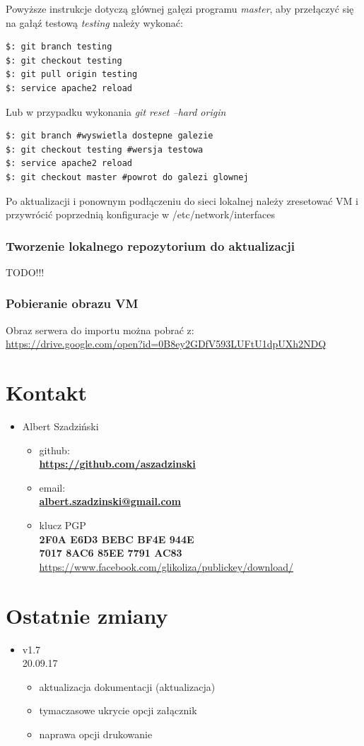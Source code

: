 \documentclass[12pt,a4paper]{article}
\begin{document}
Powyższe instrukcje dotyczą głównej gałęzi programu \textit{master}, aby przełączyć się na gałąź testową \textit{testing} należy wykonać:
\begin{lstlisting}
$: git branch testing
$: git checkout testing
$: git pull origin testing
$: service apache2 reload
\end{lstlisting}
Lub w przypadku wykonania \textit{git reset --hard origin}
\begin{lstlisting}
$: git branch #wyswietla dostepne galezie
$: git checkout testing #wersja testowa
$: service apache2 reload
$: git checkout master #powrot do galezi glownej
\end{lstlisting}
Po aktualizacji i ponownym podłączeniu do sieci lokalnej należy zresetować VM i przywrócić poprzednią konfiguracje w /etc/network/interfaces
\subsubsection{Tworzenie lokalnego repozytorium do aktualizacji}
\begin{center}
TODO!!!
\end{center}
\subsubsection{Pobieranie obrazu VM}
Obraz serwera do importu można pobrać z:\\
 \url{https://drive.google.com/open?id=0B8ey2GDfV593LUFtU1dpUXh2NDQ}

\newpage
\section{Kontakt}
\begin{itemize}
\item Albert Szadziński\\
\begin{itemize}
\item github:\\ \textbf{\url{https://github.com/aszadzinski}}
\item email:\\ \textbf{\url{albert.szadzinski@gmail.com}}
\item klucz PGP\\
\textbf{2F0A E6D3 BEBC BF4E 944E\\
7017 8AC6 85EE 7791 AC83\\}
\url{https://www.facebook.com/glikoliza/publickey/download/}
\end{itemize}
\end{itemize}
\newpage
\section{Ostatnie zmiany}
\begin{itemize}
\item v1.7\\ 
20.09.17
\begin{itemize}
\item aktualizacja dokumentacji (aktualizacja)
\item tymaczasowe ukrycie opcji załącznik
\item naprawa opcji drukowanie
\end{itemize}
\end{itemize}
\end{document}
